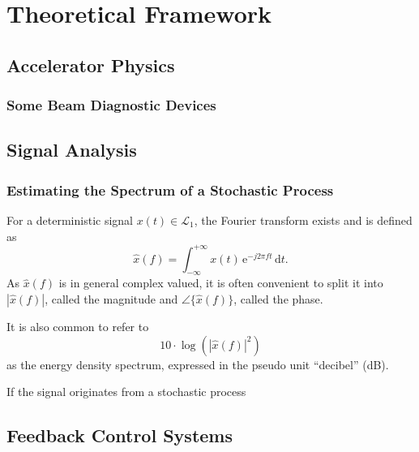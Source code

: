 \chapter{Theoretical Framework}
\section{Accelerator Physics}

\subsection{Some Beam Diagnostic Devices}

\section{Signal Analysis}
\subsection{Estimating the Spectrum of a Stochastic Process}
For a deterministic signal $x(t) \in \mathcal{L}_1$, the Fourier transform exists\cite{Lapidoth2019} and is defined as
\begin{equation}
\hat{x}(f) = \int_{-\infty}^{+\infty} x(t)\,\text{e}^{-j 2 \pi f t}\,\text{d}t.
\end{equation}
As $\hat{x}(f)$ is in general complex valued, it is often convenient to split it into $\left|\hat{x}(f)\right|$, called the magnitude and $\angle\{\hat{x}(f)\}$, called the phase.

It is also common to refer to
\begin{equation}
10\cdot\log\left(\left|\hat{x}(f)\right|^2\right)
\end{equation}
as the energy density spectrum, expressed in the pseudo unit ``decibel'' (dB).


If the signal originates from a stochastic process



\section{Feedback Control Systems}